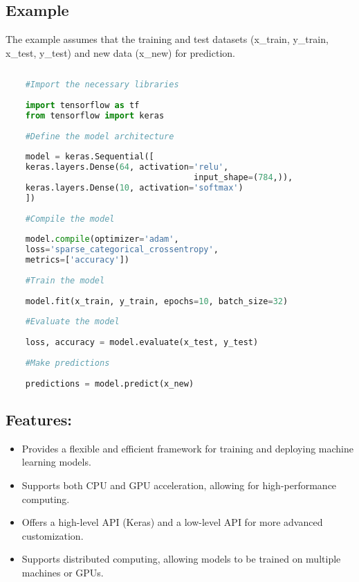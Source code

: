 \subsection{Example}
	
The example assumes that the training and test datasets (x\_train, y\_train, x\_test, y\_test) and new data (x\_new) for prediction. 

\begin{lstlisting}[language=Python]
	
	#Import the necessary libraries
	
	import tensorflow as tf
	from tensorflow import keras
	
	#Define the model architecture
	
	model = keras.Sequential([
	keras.layers.Dense(64, activation='relu',
	                                  input_shape=(784,)),
	keras.layers.Dense(10, activation='softmax')
	])
	
	#Compile the model
	
	model.compile(optimizer='adam',
	loss='sparse_categorical_crossentropy',
	metrics=['accuracy'])
	
	#Train the model
	
	model.fit(x_train, y_train, epochs=10, batch_size=32)
	
	#Evaluate the model
	
	loss, accuracy = model.evaluate(x_test, y_test)
	
	#Make predictions
	
	predictions = model.predict(x_new)
\end{lstlisting}

\subsection{Features:}

\begin{itemize}
	\item Provides a flexible and efficient framework for training and deploying machine learning models.
	\item Supports both CPU and GPU acceleration, allowing for high-performance computing.
	\item Offers a high-level API (Keras) and a low-level API for more advanced customization.
	\item Supports distributed computing, allowing models to be trained on multiple machines or GPUs.
\end{itemize}

